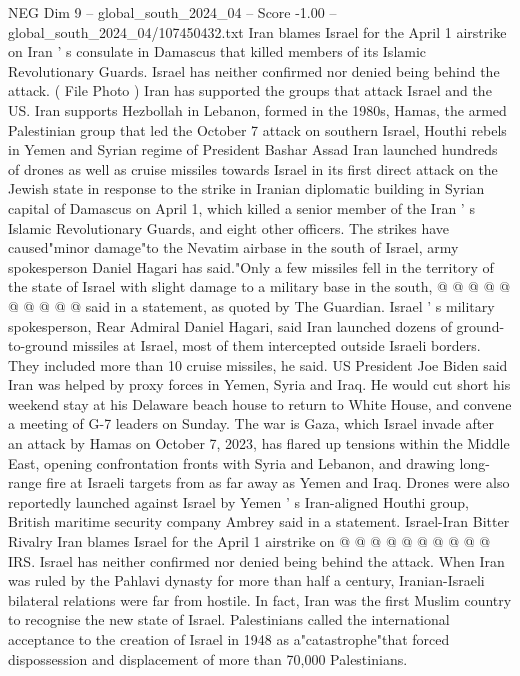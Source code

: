 \begin{textsample}{NEG Dim 9 – global\_south\_2024\_04 – Score -1.00 – global\_south\_2024\_04/107450432.txt}  \label{ex:f9_neg_382}
Iran blames Israel for the April 1 airstrike on Iran ' s consulate in Damascus that killed members of its Islamic Revolutionary Guards.
Israel has neither confirmed nor denied being behind the attack. ( File Photo ) Iran has supported the groups that attack Israel and the US.
Iran supports Hezbollah in Lebanon, formed in the 1980s, Hamas, the armed Palestinian group that led the October 7 attack on southern Israel, Houthi rebels in Yemen and Syrian regime of President Bashar Assad Iran launched hundreds of drones as well as cruise missiles towards Israel in its first direct attack on the Jewish state in response to the strike in Iranian diplomatic building in Syrian capital of Damascus on April 1, which killed a senior member of the Iran ' s Islamic Revolutionary Guards, and eight other officers.
The strikes have caused"minor damage"to the Nevatim airbase in the south of Israel, army spokesperson Daniel Hagari has said."Only a few missiles fell in the territory of the state of Israel with slight damage to a military base in the south, @ @ @ @ @ @ @ @ @ @ said in a statement, as quoted by The Guardian.
Israel ' s military spokesperson, Rear Admiral Daniel Hagari, said Iran launched dozens of ground-to-ground missiles at Israel, most of them intercepted outside Israeli borders.
They included more than 10 cruise missiles, he said.
US President Joe Biden said Iran was helped by proxy forces in Yemen, Syria and Iraq.
He would cut short his weekend stay at his Delaware beach house to return to White House, and convene a meeting of G-7 leaders on Sunday.
The war is Gaza, which Israel invade after an attack by Hamas on October 7, 2023, has flared up tensions within the Middle East, opening confrontation fronts with Syria and Lebanon, and drawing long-range fire at Israeli targets from as far away as Yemen and Iraq.
Drones were also reportedly launched against Israel by Yemen ' s Iran-aligned Houthi group, British maritime security company Ambrey said in a statement.
Israel-Iran Bitter Rivalry Iran blames Israel for the April 1 airstrike on @ @ @ @ @ @ @ @ @ @ IRS.
Israel has neither confirmed nor denied being behind the attack.
When Iran was ruled by the Pahlavi dynasty for more than half a century, Iranian-Israeli bilateral relations were far from hostile.
In fact, Iran was the first Muslim country to recognise the new state of Israel.
Palestinians called the international acceptance to the creation of Israel in 1948 as a"catastrophe"that forced dispossession and displacement of more than 70,000 Palestinians.

\end{textsample}
